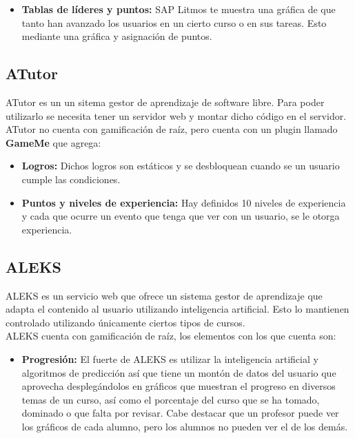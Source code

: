 \begin{multicols*}{2}
\begin{itemize}
        \item {\bf Tablas de líderes y puntos: } SAP Litmos te muestra una
         gráfica de que tanto han avanzado los usuarios en un cierto curso
         o en sus tareas. Esto mediante una gráfica y asignación de puntos.

    \end{itemize}


\subsection*{ATutor}

 ATutor \cite{PagATutor} es un un sitema gestor de aprendizaje de software libre. Para poder
 utilizarlo se necesita tener un servidor web y montar dicho código en el servidor.\\

    \noindent ATutor no cuenta con gamificación de raíz,
    pero cuenta con un plugin llamado \textbf{GameMe} que agrega:

    \begin{itemize}
        \item {\bf Logros:} Dichos logros son estáticos y se
        desbloquean cuando se un usuario cumple las condiciones.

        \item {\bf Puntos y niveles de experiencia:} Hay definidos 10
        niveles de experiencia y cada que ocurre un evento que tenga
        que ver con un usuario, se le otorga experiencia.

    \end{itemize}



\subsection*{ALEKS}

 ALEKS \cite{PagALEKS} es un servicio web que ofrece un sistema gestor de aprendizaje
 que adapta el contenido al usuario utilizando inteligencia artificial.
 Esto lo mantienen controlado utilizando únicamente ciertos tipos de cursos.\\

    \noindent ALEKS cuenta con gamificación de raíz, los elementos con los que cuenta son:

    \begin{itemize}
        \item {\bf Progresión:} El fuerte de ALEKS es utilizar la inteligencia
        artificial y algoritmos de predicción así que tiene un montón de datos del
        usuario que aprovecha desplegándolos en gráficos que muestran el progreso
        en diversos temas de un curso, así como el porcentaje del curso que se ha
        tomado, dominado o que falta por revisar. Cabe destacar que un profesor puede
        ver los gráficos de cada alumno, pero los alumnos no pueden ver el de los demás.


\end{itemize}
\end{multicols*}
